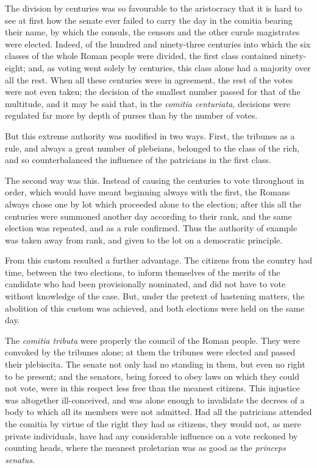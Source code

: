 \documentclass[12pt]{report}
\begin{document}
The division by centuries was so favourable to the aristocracy that it is hard to see at first how the senate ever failed to carry the day in the comitia bearing their name, by which the consuls, the censors and the other curule magistrates were elected. Indeed, of the hundred and ninety-three centuries into which the six classes of the whole Roman people were divided, the first class contained ninety-eight; and, as voting went solely by centuries, this class alone had a majority over all the rest. When all these centuries were in agreement, the rest of the votes were not even taken; the decision of the smallest number passed for that of the multitude, and it may be said that, in the \textit{comitia centuriata}, decisions were regulated far more by depth of purses than by the number of votes.

But this extreme authority was modified in two ways. First, the tribunes as a rule, and always a great number of plebeians, belonged to the class of the rich, and so counterbalanced the influence of the patricians in the first class.

The second way was this. Instead of causing the centuries to vote throughout in order, which would have meant beginning always with the first, the Romans always chose one by lot which proceeded alone to the election; after this all the centuries were summoned another day according to their rank, and the same election was repeated, and as a rule confirmed. Thus the authority of example was taken away from rank, and given to the lot on a democratic principle.

From this custom resulted a further advantage. The citizens from the country had time, between the two elections, to inform themselves of the merits of the candidate who had been provisionally nominated, and did not have to vote without knowledge of the case. But, under the pretext of hastening matters, the abolition of this custom was achieved, and both elections were held on the same day.

The \textit{comitia tributa} were properly the council of the Roman people. They were convoked by the tribunes alone; at them the tribunes were elected and passed their plebiscita. The senate not only had no standing in them, but even no right to be present; and the senators, being forced to obey laws on which they could not vote, were in this respect less free than the meanest citizens. This injustice was altogether ill-conceived, and was alone enough to invalidate the decrees of a body to which all its members were not admitted. Had all the patricians attended the comitia by virtue of the right they had as citizens, they would not, as mere private individuals, have had any considerable influence on a vote reckoned by counting heads, where the meanest proletarian was as good as the \textit{princeps senatus}.
\end{document}
